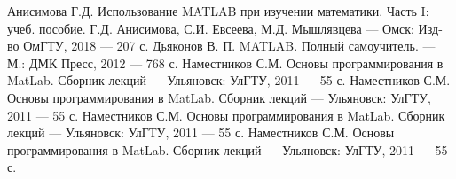 \newpage
{}
\renewcommand{\section}[2]{} %
\begin{thebibliography}{3}
\begin{thebibliography}{3}
 Анисимова Г.Д. Использование MATLAB при изучении математики. Часть I: учеб. пособие. Г.Д. Анисимова, С.И. Евсеева, М.Д. Мышлявцева — Омск: Изд-во ОмГТУ, 2018 — 207 с. 
 Дьяконов В. П. MATLAB. Полный самоучитель. — М.: ДМК Пресс, 2012 — 768 с.
 Наместников С.М. Основы программирования в MatLab. Сборник лекций — Ульяновск: УлГТУ, 2011 — 55 с.
 Наместников С.М. Основы программирования в MatLab. Сборник лекций — Ульяновск: УлГТУ, 2011 — 55 с.
 Наместников С.М. Основы программирования в MatLab. Сборник лекций — Ульяновск: УлГТУ, 2011 — 55 с.
 Наместников С.М. Основы программирования в MatLab. Сборник лекций — Ульяновск: УлГТУ, 2011 — 55 с.
\end{thebibliography}
\end{thebibliography}

